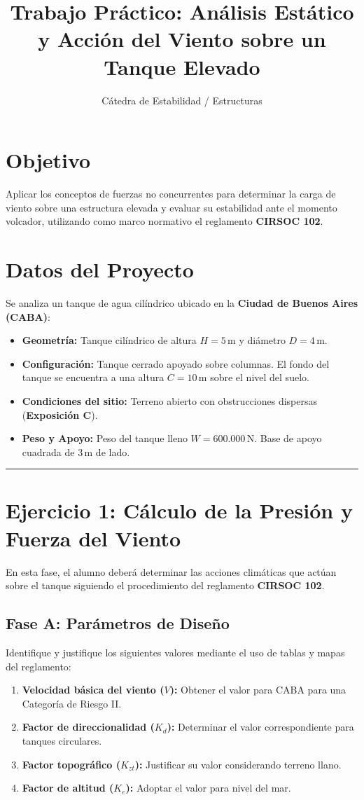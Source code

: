 \documentclass[11pt,a4paper]{article}
\title{Trabajo Práctico: Análisis Estático y Acción del Viento sobre un Tanque Elevado}
\author{Cátedra de Estabilidad / Estructuras}
\date{}
\newcommand{\linea}{\vspace{0.5cm} \hrule \vspace{0.5cm}}
\begin{document}
\maketitle

\section*{Objetivo}
Aplicar los conceptos de fuerzas no concurrentes para determinar la carga de viento sobre una estructura elevada y evaluar su estabilidad ante el momento volcador, utilizando como marco normativo el reglamento \textbf{CIRSOC 102}.

\section*{Datos del Proyecto}
Se analiza un tanque de agua cilíndrico ubicado en la \textbf{Ciudad de Buenos Aires (CABA)}:
\begin{itemize}
    \item \textbf{Geometría:} Tanque cilíndrico de altura $H = 5\,\text{m}$ y diámetro $D = 4\,\text{m}$.
    \item \textbf{Configuración:} Tanque cerrado apoyado sobre columnas. El fondo del tanque se encuentra a una altura $C = 10\,\text{m}$ sobre el nivel del suelo.
    \item \textbf{Condiciones del sitio:} Terreno abierto con obstrucciones dispersas (\textbf{Exposición C}).
    \item \textbf{Peso y Apoyo:} Peso del tanque lleno $W = 600.000\,\text{N}$. Base de apoyo cuadrada de $3\,\text{m}$ de lado.
\end{itemize}

\linea

\section*{Ejercicio 1: Cálculo de la Presión y Fuerza del Viento}

En esta fase, el alumno deberá determinar las acciones climáticas que actúan sobre el tanque siguiendo el procedimiento del reglamento \textbf{CIRSOC 102}.

\subsection*{Fase A: Parámetros de Diseño}
Identifique y justifique los siguientes valores mediante el uso de tablas y mapas del reglamento:
\begin{enumerate}
    \item \textbf{Velocidad básica del viento ($V$):} Obtener el valor para CABA para una Categoría de Riesgo II.
    \item \textbf{Factor de direccionalidad ($K_d$):} Determinar el valor correspondiente para tanques circulares.
    \item \textbf{Factor topográfico ($K_{zt}$):} Justificar su valor considerando terreno llano.
    \item \textbf{Factor de altitud ($K_e$):} Adoptar el valor para nivel del mar.
\end{enumerate}
\end{document}

